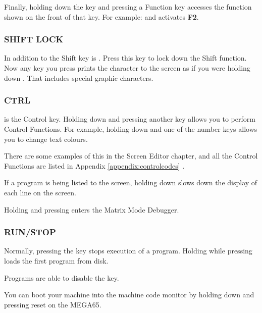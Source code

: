 Finally, holding down the  key and pressing a Function key accesses the function shown on the front of that key. For example:  and  activates \textbf{F2}.


\subsubsection{SHIFT LOCK}

In addition to the Shift key is . Press this key to lock down the Shift function. Now any key you press prints the character to the screen as if you were holding down . That includes special graphic characters.

\subsubsection{CTRL}

 is the Control key. Holding down  and pressing another key allows you to perform Control Functions. For example, holding down  and one of the number keys allows you to change text colours.

There are some examples of this in the Screen Editor chapter, and all the Control Functions are listed in Appendix \ref{appendix:controlcodes}  .

If a program is being listed to the screen, holding down  slows down the display of each line on the screen.

Holding  and pressing \megakey{*} enters the Matrix Mode Debugger.

\subsubsection{RUN/STOP}

Normally, pressing the  key stops execution of a program. Holding  while pressing  loads the first program from disk.

Programs are able to disable the  key.

You can boot your machine into the machine code monitor by holding down  and pressing reset on the MEGA65.

